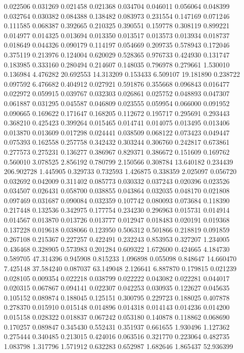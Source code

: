 0.022506
0.031269
0.021458
0.021368
0.034704
0.046011
0.056064
0.048399
0.032764
0.030382
0.084388
0.138482
0.083973
0.231554
0.147169
0.071246
0.111585
0.068387
0.392665
0.210325
0.390551
0.159778
0.308119
0.899221
0.014977
0.014325
0.013694
0.013350
0.013517
0.013573
0.013934
0.018737
0.018649
0.044326
0.090179
0.114197
0.054669
0.209735
0.578943
0.172046
0.375119
0.213976
0.124004
0.620029
0.528365
0.976733
0.424930
0.131747
0.183985
0.333160
0.280494
0.214607
0.148035
0.796978
0.279661
1.530010
0.136984
4.476282
20.692553
14.313209
0.153433
6.509107
19.181890
0.238722
0.097592
6.476682
0.404912
0.027921
0.591876
0.355668
0.096843
0.016477
0.022972
0.059915
0.039767
0.032303
0.026861
0.025752
0.048893
0.047307
0.061887
0.031295
0.045587
0.046809
0.023555
0.059954
0.066000
0.091952
0.090665
0.169622
0.171647
0.168205
0.112672
0.195717
0.295691
0.293443
0.368210
0.425423
0.399264
0.015465
0.014741
0.014075
0.013495
0.013406
0.013870
0.013609
0.017298
0.024441
0.038509
0.068122
0.073423
0.049447
0.075393
0.162558
0.257758
0.342432
0.303244
0.306760
0.242817
0.673861
0.277573
0.275231
0.136277
0.386967
0.829371
0.386672
0.151609
0.169762
0.560010
3.078525
2.856192
0.780799
2.150566
0.308784
13.640182
0.234439
206.902728
1.445905
0.329733
0.732593
1.426875
0.338359
2.025097
0.056720
0.032692
0.042009
0.311402
0.085773
0.030332
0.037243
0.020396
0.023526
0.034507
0.026431
0.058700
0.038855
0.043864
0.032035
0.048170
0.021808
0.097469
0.031687
0.090084
0.032359
0.107742
0.080093
0.073684
0.118390
0.217448
0.132536
0.342975
0.177754
0.234230
0.296963
0.015731
0.014914
0.014567
0.013870
0.013726
0.013777
0.012947
0.018483
0.020191
0.019368
0.137228
0.019618
0.038066
0.123950
0.506312
0.501866
0.218819
0.091859
0.267108
0.215367
0.227257
0.422491
0.232243
0.853953
0.327207
1.234005
0.436468
0.328905
0.573983
0.201284
0.609322
1.672600
0.424665
4.184730
0.589705
47.314396
0.945908
0.815233
1.096898
0.055098
0.848647
14.660470
7.425148
37.584240
0.087037
63.149048
2.126641
6.887870
0.179815
0.021239
0.028105
0.009354
0.022218
0.038799
0.022222
0.043082
0.022281
0.044017
0.020315
0.067867
0.094141
0.022307
0.042253
0.030935
0.122627
0.045635
0.105152
0.089874
0.188045
0.125151
0.300795
0.229723
0.188025
0.407878
0.278370
0.015910
0.015148
0.014896
0.014318
0.014143
0.014236
0.014200
0.015158
0.028322
0.018837
0.067242
0.053180
0.140878
0.118862
0.068690
0.170257
0.089847
0.345430
0.552431
0.351937
0.661655
1.930496
1.127362
0.275444
0.340485
0.213015
0.424016
0.063516
0.321770
0.223064
0.482735
1.083798
1.317796
1.571912
0.632283
0.652987
1.682646
1.865437
52.936399
